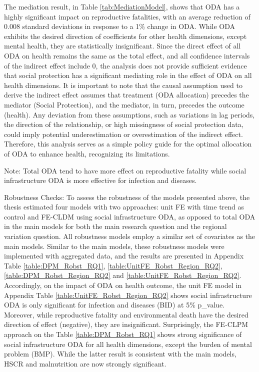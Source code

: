 The mediation result, in Table \ref{tab:MediationModel}, shows that ODA has a highly significant impact on reproductive fatalities, with an average reduction of 0.008 standard deviations in response to a 1\% change in ODA. While ODA exhibits the desired direction of coefficients for other health dimensions, except mental health, they are statistically insignificant. Since the direct effect of all ODA on health remains the same as the total effect, and all confidence intervals of the indirect effect include 0, the analysis does not provide sufficient evidence that social protection has a significant mediating role in the effect of ODA on all health dimensions. It is important to note that the causal assumption used to derive the indirect effect assumes that treatment (ODA allocation) precedes the mediator (Social Protection), and the mediator, in turn, precedes the outcome (health). Any deviation from these assumptions, such as variations in lag periods, the direction of the relationship, or high missingness of social protection data, could imply potential underestimation or overestimation of the indirect effect. Therefore, this analysis serves as a simple policy guide for the optimal allocation of ODA to enhance health, recognizing its limitations.


Note: Total ODA tend to have more effect on reproductive fatality while social infrastructure ODA is more effective for infection and diseases.


Robustness Checks:
To assess the robustness of the models presented above, the thesis estimated four models with two approaches: unit FE with time trend as control and FE-CLDM using social infrastructure ODA, as opposed to total ODA in the main models for both the main research question and the regional variation question. All robustness models employ a similar set of covariates as the main models. Similar to the main models, these robustness models were implemented with aggregated data, and the results are presented in Appendix Table \ref{table:DPM_Robst_RQ1}, \ref{table:UnitFE_Robst_Region_RQ2}, \ref{table:DPM_Robst_Region_RQ2} and \ref{table:UnitFE_Robst_Region_RQ2}.
Accordingly, on the impact of ODA on health outcome, the unit FE model in Appendix Table \ref{table:UnitFE_Robst_Region_RQ2} shows social infrastructure ODA is only significant for infection and diseases (BID) at 5\% p\_value. Moreover, while reproductive fatality and environmental death have the desired direction of effect (negative), they are insignificant. Surprisingly, the FE-CLPM approach on the Table \ref{table:DPM_Robst_RQ1} shows strong significance of social infrastructure ODA for all health dimensions, except the burden of mental problem (BMP). While the latter result is consistent with the main models, HSCR and malnutrition are now strongly significant. 

